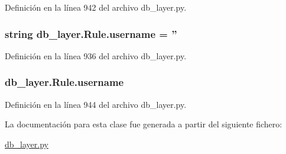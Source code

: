 Definición en la línea 942 del archivo db\-\_\-layer.\-py.

\hypertarget{classdb__layer_1_1_rule_a3b04471d06abe2199c7f9deb646be68d}{
\subsubsection[{username}]{\setlength{\rightskip}{0pt plus 5cm}string db\-\_\-layer.\-Rule.\-username = ''\hspace{0.3cm}{\ttfamily [static]}}}\label{classdb__layer_1_1_rule_a3b04471d06abe2199c7f9deb646be68d}


Definición en la línea 936 del archivo db\-\_\-layer.\-py.

\hypertarget{classdb__layer_1_1_rule_adb9fcf60a52edeada35d9074b1533080}{
\subsubsection[{username}]{\setlength{\rightskip}{0pt plus 5cm}db\-\_\-layer.\-Rule.\-username}}\label{classdb__layer_1_1_rule_adb9fcf60a52edeada35d9074b1533080}


Definición en la línea 944 del archivo db\-\_\-layer.\-py.



La documentación para esta clase fue generada a partir del siguiente fichero\-:\begin{DoxyCompactItemize}
\item 
\hyperlink{db__layer_8py}{db\-\_\-layer.\-py}\end{DoxyCompactItemize}
